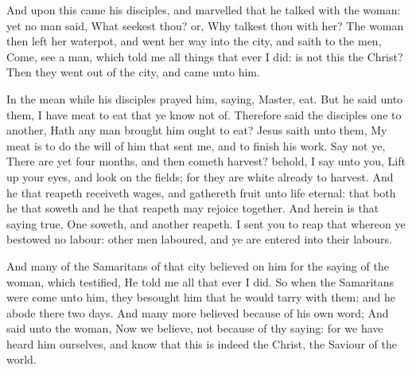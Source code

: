  And upon this came his disciples, and marvelled that he
talked with the woman: yet no man said, What seekest thou? or, Why
talkest thou with her?  The woman then left her waterpot,
and went her way into the city, and saith to the men, 
Come, see a man, which told me all things that ever I did: is not this
the Christ?  Then they went out of the city, and came
unto him.

 In the mean while his disciples prayed him, saying,
Master, eat.  But he said unto them, I have meat to eat
that ye know not of.  Therefore said the disciples one to
another, Hath any man brought him ought to eat?  Jesus
saith unto them, My meat is to do the will of him that sent me, and to
finish his work.  Say not ye, There are yet four months,
and then cometh harvest? behold, I say unto you, Lift up your eyes, and
look on the fields; for they are white already to harvest.
 And he that reapeth receiveth wages, and gathereth fruit
unto life eternal: that both he that soweth and he that reapeth may
rejoice together.  And herein is that saying true, One
soweth, and another reapeth.  I sent you to reap that
whereon ye bestowed no labour: other men laboured, and ye are entered
into their labours.

 And many of the Samaritans of that city believed on him
for the saying of the woman, which testified, He told me all that ever I
did.  So when the Samaritans were come unto him, they
besought him that he would tarry with them: and he abode there two days.
 And many more believed because of his own word;
 And said unto the woman, Now we believe, not because of
thy saying: for we have heard him ourselves, and know that this is
indeed the Christ, the Saviour of the world.


